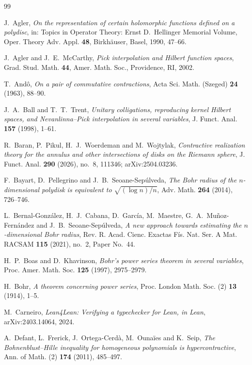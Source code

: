 \documentclass[11pt]{amsart}
\theoremstyle{remark}
\numberwithin{equation}{section}
\begin{document}
\begin{thebibliography}{99}

 J.~Agler, \emph{On the representation of certain holomorphic functions defined on a polydisc}, in: Topics in Operator Theory: Ernst D.~Hellinger Memorial Volume, Oper. Theory Adv. Appl. \textbf{48}, Birkh\"auser, Basel, 1990, 47--66.

 J.~Agler and J.~E.~McCarthy, \emph{Pick interpolation and Hilbert function spaces}, Grad. Stud. Math. \textbf{44}, Amer. Math. Soc., Providence, RI, 2002.

 T.~And\^o, \emph{On a pair of commutative contractions}, Acta Sci. Math. (Szeged) \textbf{24} (1963), 88--90.

 J.~A.~Ball and T.~T.~Trent, \emph{Unitary colligations, reproducing kernel Hilbert spaces, and Nevanlinna--Pick interpolation in several variables}, J. Funct. Anal. \textbf{157} (1998), 1--61.

 R.~Baran, P.~Pikul, H.~J.~Woerdeman and M.~Wojtylak, \emph{Contractive realization theory for the annulus and other intersections of disks on the Riemann sphere}, J. Funct. Anal. \textbf{290} (2026), no.~8, 111346; arXiv:2504.03236.

 F.~Bayart, D.~Pellegrino and J.~B.~Seoane-Sep\'ulveda, \emph{The Bohr radius of the $n$-dimensional polydisk is equivalent to $\sqrt{(\log n)/n}$}, Adv. Math. \textbf{264} (2014), 726--746.

 L.~Bernal-Gonz\'alez, H.~J.~Cabana, D.~Garc\'ia, M.~Maestre, G.~A.~Mu\~noz-Fern\'andez and J.~B.~Seoane-Sep\'ulveda, \emph{A new approach towards estimating the $n$-dimensional Bohr radius}, Rev. R. Acad. Cienc. Exactas F\'is. Nat. Ser. A Mat. RACSAM \textbf{115} (2021), no.~2, Paper No.~44.

 H.~P.~Boas and D.~Khavinson, \emph{Bohr's power series theorem in several variables}, Proc. Amer. Math. Soc. \textbf{125} (1997), 2975--2979.

 H.~Bohr, \emph{A theorem concerning power series}, Proc. London Math. Soc. (2) \textbf{13} (1914), 1--5.

 M.~Carneiro, \emph{Lean4Lean: Verifying a typechecker for Lean, in Lean}, arXiv:2403.14064, 2024.

 A.~Defant, L.~Frerick, J.~Ortega-Cerd\`a, M.~Ouna\"ies and K.~Seip, \emph{The Bohnenblust--Hille inequality for homogeneous polynomials is hypercontractive}, Ann. of Math. (2) \textbf{174} (2011), 485--497.


\end{thebibliography}
\end{document}
